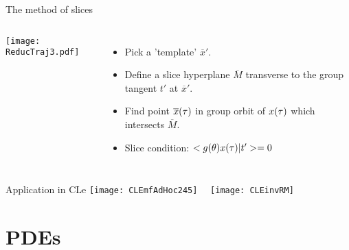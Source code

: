 \begin{frame}[t]{The method of slices}
 \begin{block}{}
  \begin{columns}
	  \texttt{[image: ReducTraj3.pdf]}
	\begin{itemize}
	  \item Pick a 'template' $\overline{x}'$.
	  \item Define a slice hyperplane $\overline{M}$ transverse to the group tangent $t'$ at $\overline{x}'$.
	  \item Find point $\overline{x}(\tau)$ in group orbit of $x(\tau)$ which intersects $\overline{M}$.
	  \item Slice condition: $<g(\theta)x(\tau)|t'>=0$
	\end{itemize}
  \end{columns}
 \end{block}
\end{frame}

\begin{frame}{Application in CLe}
 \centering
  \texttt{[image: CLEmfAdHoc245]}~~
  \texttt{[image: CLEinvRM]}
\end{frame}

\section{PDEs}

